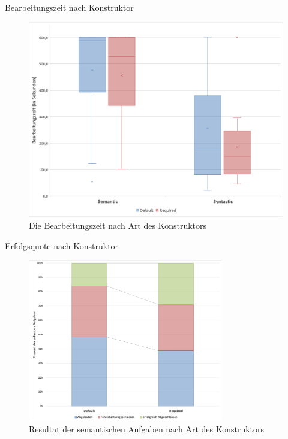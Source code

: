 \documentclass[10pt]{beamer}
\begin{document}
	\begin{frame}{Bearbeitungszeit nach Konstruktor}
		\begin{figure}
			\includegraphics[scale=0.32]{graphics/box_time-constructor.png}
			\caption{\label{fig:box_time-constructor.png} Die Bearbeitungszeit nach Art des Konstruktors}
		\end{figure}
	\end{frame}

	\begin{frame}{Erfolgsquote nach Konstruktor}
		\begin{figure}
			\includegraphics[width=0.76\textwidth]{graphics/bar_result_sem.png}
			\caption{\label{fig:bar_result_sem.png} Resultat der semantischen Aufgaben nach Art des Konstruktors}
		\end{figure}
	\end{frame}
\end{document}
